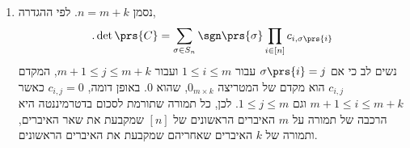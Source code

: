 \documentclass[a4paper,10pt,twoside,openany]{book}
\newcommand*\mymatrixbox[5][]{\node [fit= (m-#2-#3) (m-#4-#5)] [draw=blue,thick,dashed,rounded corners,inner sep=-2pt,#1] {};}
\newcommand{\highlightcells}[2][]{%
  \foreach \r/\c in {#2} {%
    \mymatrixbox[#1]{\r}{\c}{\r}{\c}%
  }%
}
\begin{document}
\begin{solution}
\begin{enumerate}
\begin{center}
\end{center}

באופן דומה, אם בשורה הראשונה נבחר את המקדם ה־%
$1$,
נצטרך בשורה האחרונה לבחור את המקדם ה־%
$3$
ונקבל בסוף את בחירת המקדמים הבאה, המתאימה לתמורה
$\sigma_2 \coloneqq \prs{4, 1, 2, 3}$.

\begin{center}
\end{center}

ראינו בתרגיל קודם שסימן תמורה זאת הוא
$\sgn{\sigma_2} = \prs{-1}^{4-1} = -1$,
ולכן בסך הכל נקבל כי
\begin{align*}
\text{.} \det\prs{B} = \textcolor{red}{1} + \textcolor{blue}{\prs{-1}} = 0
\end{align*}

\item
נסמן
$n = m+k$.
לפי ההגדרה,
\begin{align*}
\text{.} \det\prs{C} = \sum_{\sigma \in S_n} \sgn\prs{\sigma} \prod_{i \in [n]} c_{i, \sigma\prs{i}}
\end{align*}
נשים לב כי אם
$\sigma\prs{i} = j$
עבור
$1 \leq i \leq m$
ועבור
$m+1 \leq j \leq m+k$,
המקדם
$c_{i,j}$
הוא מקדם של המטריצה
$0_{m \times k}$,
שהוא
$0$.
באופן דומה,
$c_{i,j} = 0$
כאשר
$m+1 \leq i \leq m+k$
וגם
$1 \leq j \leq m$.
לכן, כל תמורה שתורמת לסכום בדטרמיננטה היא הרכבה של תמורה על
$m$
האיברים הראשונים של
$[n]$
שמקבעת את שאר האיברים,
ותמורה של
$k$
האיברים שאחריהם שמקבעת את האיברים הראשונים.


\end{enumerate}
\end{solution}
\end{document}
